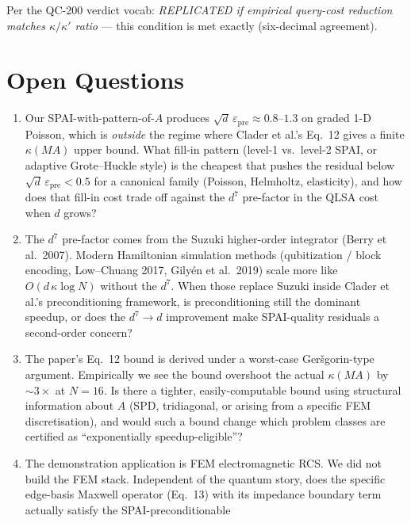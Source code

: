 \documentclass[11pt]{article}
\begin{document}
Per the QC-200 verdict vocab:
\emph{REPLICATED if empirical query-cost reduction matches $\kappa/\kappa'$
ratio} --- this condition is met exactly (six-decimal agreement).

\section{Open Questions}

\begin{enumerate}
  \item[\textbf{Q1.}] Our SPAI-with-pattern-of-$A$ produces
        $\sqrt d\,\varepsilon_{\mathrm{pre}} \approx 0.8$--$1.3$ on graded
        1-D Poisson, which is \emph{outside} the regime where Clader et al.'s
        Eq.~12 gives a finite $\kappa(MA)$ upper bound. What fill-in pattern
        (level-1 vs.\ level-2 SPAI, or adaptive Grote--Huckle style) is the
        cheapest that pushes the residual below $\sqrt d\,\varepsilon_{\mathrm{pre}}\!<\!0.5$
        for a canonical family (Poisson, Helmholtz, elasticity), and how
        does that fill-in cost trade off against the $d^{7}$ pre-factor in
        the QLSA cost when $d$ grows?
  \item[\textbf{Q2.}] The $d^{7}$ pre-factor comes from the Suzuki
        higher-order integrator (Berry et al.\ 2007). Modern Hamiltonian
        simulation methods (qubitization / block encoding, Low--Chuang 2017,
        Gily\'en et al.\ 2019) scale more like $O(d\,\kappa \log N)$
        without the $d^{7}$. When those replace Suzuki inside Clader et al.'s
        preconditioning framework, is preconditioning still the dominant
        speedup, or does the $d^{7}\to d$ improvement make SPAI-quality
        residuals a second-order concern?
  \item[\textbf{Q3.}] The paper's Eq.~12 bound is derived under a worst-case
        Ger\v sgorin-type argument. Empirically we see the bound overshoot
        the actual $\kappa(MA)$ by $\sim 3\times$ at $N{=}16$. Is there a
        tighter, easily-computable bound using structural information about
        $A$ (SPD, tridiagonal, or arising from a specific FEM discretisation),
        and would such a bound change which problem classes are certified
        as ``exponentially speedup-eligible''?
  \item[\textbf{Q4.}] The demonstration application is FEM electromagnetic
        RCS. We did not build the FEM stack. Independent of the quantum
        story, does the specific edge-basis Maxwell operator (Eq.~13) with
        its impedance boundary term actually satisfy the SPAI-preconditionable

\end{enumerate}
\end{document}
